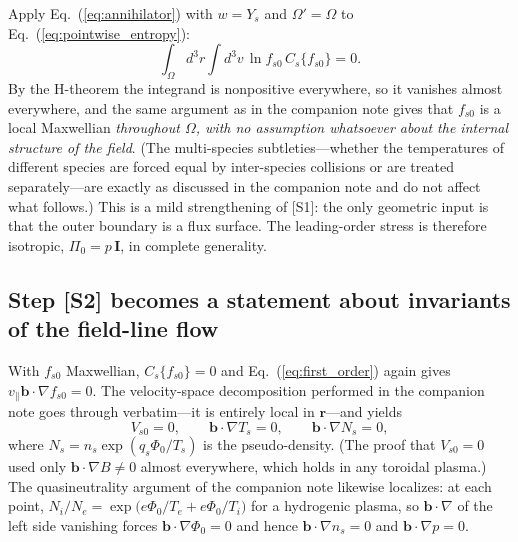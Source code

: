 \documentclass[english]{article}
\newcommand{\bb}{\mathbf{b}}
\newcommand{\br}{\mathbf{r}}
\newcommand{\bI}{\mathbf{I}}
\begin{document}
Apply Eq.~(\ref{eq:annihilator}) with $w=Y_s$ and $\Omega'=\Omega$ to
Eq.~(\ref{eq:pointwise_entropy}):
\begin{equation}
\int_\Omega d^3r\int d^3v\,\ln f_{s0}\,C_s\{f_{s0}\}=0 .
\end{equation}
By the H-theorem the integrand is nonpositive everywhere, so it vanishes almost everywhere, and the
same argument as in the companion note gives that $f_{s0}$ is a local Maxwellian
\emph{throughout $\Omega$, with no assumption whatsoever about the internal structure of the field}.
(The multi-species subtleties---whether the temperatures of different species are forced equal by
inter-species collisions or are treated separately---are exactly as discussed in the companion note
and do not affect what follows.) This is a mild strengthening of [S1]: the only geometric input is
that the outer boundary is a flux surface. The leading-order stress is therefore isotropic,
$\Pi_0=p\,\bI$, in complete generality.

\subsection{Step [S2] becomes a statement about invariants of the field-line flow}
\label{sec:invariants}

With $f_{s0}$ Maxwellian, $C_s\{f_{s0}\}=0$ and Eq.~(\ref{eq:first_order}) again gives
$v_\parallel\bb\cdot\nabla f_{s0}=0$. The velocity-space decomposition performed in the companion
note goes through verbatim---it is entirely local in $\br$---and yields
\begin{equation}
V_{s0}=0,\qquad \bb\cdot\nabla T_s=0,\qquad \bb\cdot\nabla N_s=0 ,
\label{eq:parallel_constraints}
\end{equation}
where $N_s=n_s\exp(q_s\Phi_0/T_s)$ is the pseudo-density. (The proof that $V_{s0}=0$ used only
$\bb\cdot\nabla B\ne0$ almost everywhere, which holds in any toroidal plasma.) The quasineutrality
argument of the companion note likewise localizes: at each point,
$N_i/N_e=\exp\big(e\Phi_0/T_e+e\Phi_0/T_i\big)$ for a hydrogenic plasma, so $\bb\cdot\nabla$ of the
left side vanishing forces $\bb\cdot\nabla\Phi_0=0$ and hence $\bb\cdot\nabla n_s=0$ and
$\bb\cdot\nabla p=0$.
\end{document}
